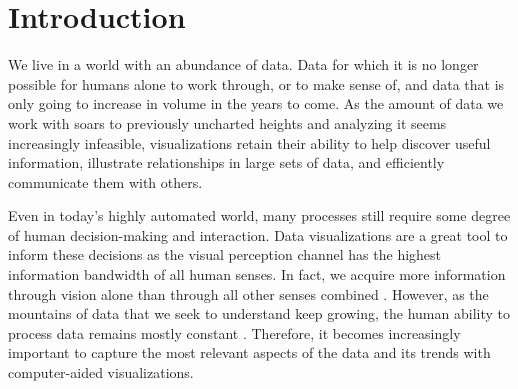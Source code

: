 \chapter{Introduction}
\label{chap:introduction}

We live in a world with an abundance of data.
Data for which it is no longer possible for humans alone to work through, or to make sense of, and data that is only going to increase in volume in the years to come.
As the amount of data we work with soars to previously uncharted heights and analyzing it seems increasingly infeasible, visualizations retain their ability to help discover useful information, illustrate relationships in large sets of data, and efficiently communicate them with others.

Even in today's highly automated world, many processes still require some degree of human decision-making and interaction.
Data visualizations are a great tool to inform these decisions as the visual perception channel has the highest information bandwidth of all human senses.
In fact, we acquire more information through vision alone than through all other senses combined \cite{ware2019information}.
However, as the mountains of data that we seek to understand keep growing, the human ability to process data remains mostly constant \cite{dachsbacher2019visualisierung}.
Therefore, it becomes increasingly important to capture the most relevant aspects of the data and its trends with computer-aided visualizations.





